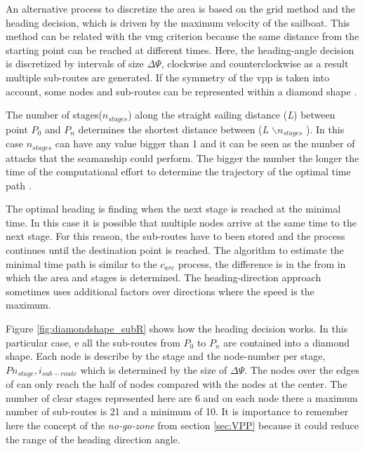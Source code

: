 An alternative process to discretize the area is based on the grid method and the heading decision, which is driven by the maximum velocity of the sailboat. This method can be related with the \acrshort{vmg} criterion because the same distance from the starting point can be reached at different times. Here, the heading-angle decision is discretized by intervals of size $\Delta \Psi$, clockwise and counterclockwise as a result multiple sub-routes are generated. If the symmetry of the \acrshort{vpp} is taken into account, some nodes and sub-routes can be represented within a diamond shape \cite{xing2012path} \cite{zyczkowski2017method}. \par \noindent
The number of stages($n_{stages}$) along the straight sailing distance (\textit{L}) between point $P_{0}$ and $P_{n}$ determines the shortest distance between (\textit{L} $\backslash n_{stages}$ ). In this case $n_{stages}$ can have any value bigger than 1 and it can be seen as the number of attacks that the seamanship could perform. The bigger the number the longer the time of the computational effort to determine the trajectory of the optimal time path \cite{xing2012path}. \par 
\noindent
The optimal heading is finding when the next stage is reached at the minimal time. In this case it is possible that multiple nodes arrive at the same time to the next stage. For this reason, the sub-routes have to been stored and the process continues until the destination point is reached. The algorithm to estimate the minimal time path is similar to the $c_{arc}$ process, the difference is in the from in which the area and stages is determined. The heading-direction approach sometimes uses additional factors over directions where the speed is the maximum. \par

Figure \ref{fig:diamondshape_subR} shows how the heading decision works. In this particular case, e all the sub-routes from $P_{0}$ to $P_{n}$ are contained into a diamond shape. Each node is describe by the stage and the node-number per stage, $P n_{stage},i_{sub-route}$ which is determined by the size of $\Delta \Psi$. The nodes over the edges of can only reach the half of nodes compared with the nodes at the center. The number of clear stages represented here are 6 and on each node there a maximum number of sub-routes is 21 and a minimum of 10. It is importance to remember here the concept of the \textit{no-go-zone} from section \ref{sec:VPP} because it could reduce the range of the heading direction angle.\par 

